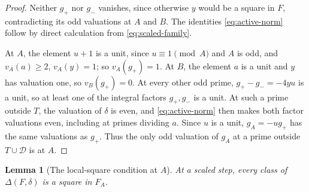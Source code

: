 \documentclass[11pt]{article}
\theoremstyle{plain}
\newtheorem{lemma}[theorem]{Lemma}
\theoremstyle{definition}
\theoremstyle{remark}
\begin{document}
\begin{proof}
Neither $g_+$ nor $g_-$ vanishes, since otherwise $y$ would be a square in
$F$, contradicting its odd valuations at $A$ and $B$.  The identities
\eqref{eq:active-norm} follow by direct calculation from
\eqref{eq:scaled-family}.

At $A$, the element $u+1$ is a unit, since $u\equiv1\pmod A$ and $A$ is
odd, and $v_A(a)\ge2$, $v_A(y)=1$; so $v_A(g_+)=1$.  At $B$, the element
$a$ is a unit and $y$ has valuation one, so $v_B(g_+)=0$.  At every other
odd prime, $g_+-g_-=-4yu$ is a unit, so at least one of the integral
factors $g_+,g_-$ is a unit.  At such a prime outside $T$, the valuation
of $\delta$ is even, and \eqref{eq:active-norm} then makes both factor
valuations even, including at primes dividing $a$.  Since $u$ is a unit,
$g_A=-ug_+$ has the same valuations as $g_+$.  Thus the only odd
valuation of $g_A$ at a prime outside $T\cup\mathcal D$ is at $A$.
\end{proof}

\begin{lemma}[The local-square condition at $A$]\label{lem:A-square}
At a scaled step, every class of $\Delta(F,\delta)$ is a square in $F_A$.
\end{lemma}
\end{document}
